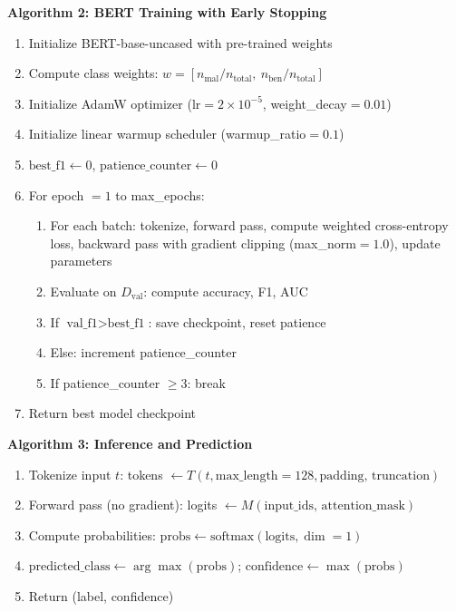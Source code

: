\documentclass[11pt]{article}
\begin{document}
\textbf{Algorithm 2: BERT Training with Early Stopping}
\begin{enumerate}[leftmargin=*]
  \item Initialize BERT-base-uncased with pre-trained weights
  \item Compute class weights: $w = [n_{\text{mal}}/n_{\text{total}},\ n_{\text{ben}}/n_{\text{total}}]$
  \item Initialize AdamW optimizer ($\text{lr}=2\times10^{-5}$, weight\_decay$=0.01$)
  \item Initialize linear warmup scheduler (warmup\_ratio$=0.1$)
  \item $\text{best\_f1} \gets 0$, $\text{patience\_counter} \gets 0$
  \item For epoch $= 1$ to max\_epochs:
    \begin{enumerate}
      \item For each batch: tokenize, forward pass, compute weighted cross-entropy loss, backward pass with gradient clipping (max\_norm$=1.0$), update parameters
      \item Evaluate on $D_{\text{val}}$: compute accuracy, F1, AUC
      \item If $\text{val\_f1} > \text{best\_f1}$: save checkpoint, reset patience
      \item Else: increment patience\_counter
      \item If patience\_counter $\geq 3$: break
    \end{enumerate}
  \item Return best model checkpoint
\end{enumerate}

\textbf{Algorithm 3: Inference and Prediction}
\begin{enumerate}[leftmargin=*]
  \item Tokenize input $t$: tokens $\gets T(t, \text{max\_length}=128, \text{padding, truncation})$
  \item Forward pass (no gradient): logits $\gets M(\text{input\_ids, attention\_mask})$
  \item Compute probabilities: $\text{probs} \gets \text{softmax}(\text{logits}, \dim=1)$
  \item $\text{predicted\_class} \gets \arg\max(\text{probs})$; $\text{confidence} \gets \max(\text{probs})$
  \item Return (label, confidence)
\end{enumerate}

\end{document}
